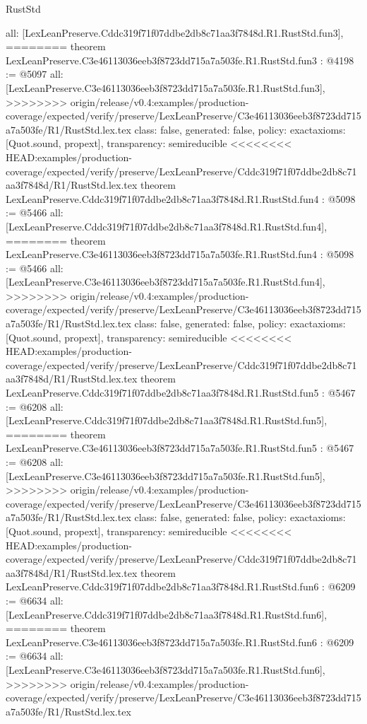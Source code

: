 \begin{lexlean}{RustStd}
\begin{coremodule}
{\begin{coremodule}
{{{{{{  all: [LexLeanPreserve.Cddc319f71f07ddbe2db8c71aa3f7848d.R1.RustStd.fun3],
========
theorem LexLeanPreserve.C3e46113036eeb3f8723dd715a7a503fe.R1.RustStd.fun3 : @4198 := @5097 {
  all: [LexLeanPreserve.C3e46113036eeb3f8723dd715a7a503fe.R1.RustStd.fun3],
>>>>>>>> origin/release/v0.4:examples/production-coverage/expected/verify/preserve/LexLeanPreserve/C3e46113036eeb3f8723dd715a7a503fe/R1/RustStd.lex.tex
  class: false,
  generated: false,
  policy: exact{axioms: [Quot.sound, propext]},
  transparency: semireducible
}
<<<<<<<< HEAD:examples/production-coverage/expected/verify/preserve/LexLeanPreserve/Cddc319f71f07ddbe2db8c71aa3f7848d/R1/RustStd.lex.tex
theorem LexLeanPreserve.Cddc319f71f07ddbe2db8c71aa3f7848d.R1.RustStd.fun4 : @5098 := @5466 {
  all: [LexLeanPreserve.Cddc319f71f07ddbe2db8c71aa3f7848d.R1.RustStd.fun4],
========
theorem LexLeanPreserve.C3e46113036eeb3f8723dd715a7a503fe.R1.RustStd.fun4 : @5098 := @5466 {
  all: [LexLeanPreserve.C3e46113036eeb3f8723dd715a7a503fe.R1.RustStd.fun4],
>>>>>>>> origin/release/v0.4:examples/production-coverage/expected/verify/preserve/LexLeanPreserve/C3e46113036eeb3f8723dd715a7a503fe/R1/RustStd.lex.tex
  class: false,
  generated: false,
  policy: exact{axioms: [Quot.sound, propext]},
  transparency: semireducible
}
<<<<<<<< HEAD:examples/production-coverage/expected/verify/preserve/LexLeanPreserve/Cddc319f71f07ddbe2db8c71aa3f7848d/R1/RustStd.lex.tex
theorem LexLeanPreserve.Cddc319f71f07ddbe2db8c71aa3f7848d.R1.RustStd.fun5 : @5467 := @6208 {
  all: [LexLeanPreserve.Cddc319f71f07ddbe2db8c71aa3f7848d.R1.RustStd.fun5],
========
theorem LexLeanPreserve.C3e46113036eeb3f8723dd715a7a503fe.R1.RustStd.fun5 : @5467 := @6208 {
  all: [LexLeanPreserve.C3e46113036eeb3f8723dd715a7a503fe.R1.RustStd.fun5],
>>>>>>>> origin/release/v0.4:examples/production-coverage/expected/verify/preserve/LexLeanPreserve/C3e46113036eeb3f8723dd715a7a503fe/R1/RustStd.lex.tex
  class: false,
  generated: false,
  policy: exact{axioms: [Quot.sound, propext]},
  transparency: semireducible
}
<<<<<<<< HEAD:examples/production-coverage/expected/verify/preserve/LexLeanPreserve/Cddc319f71f07ddbe2db8c71aa3f7848d/R1/RustStd.lex.tex
theorem LexLeanPreserve.Cddc319f71f07ddbe2db8c71aa3f7848d.R1.RustStd.fun6 : @6209 := @6634 {
  all: [LexLeanPreserve.Cddc319f71f07ddbe2db8c71aa3f7848d.R1.RustStd.fun6],
========
theorem LexLeanPreserve.C3e46113036eeb3f8723dd715a7a503fe.R1.RustStd.fun6 : @6209 := @6634 {
  all: [LexLeanPreserve.C3e46113036eeb3f8723dd715a7a503fe.R1.RustStd.fun6],
>>>>>>>> origin/release/v0.4:examples/production-coverage/expected/verify/preserve/LexLeanPreserve/C3e46113036eeb3f8723dd715a7a503fe/R1/RustStd.lex.tex
}}}}}}}}}}
\end{coremodule}}
\end{coremodule}
\end{lexlean}
